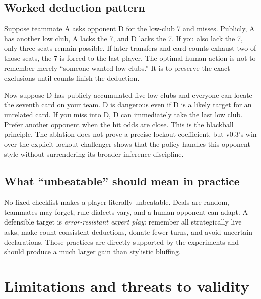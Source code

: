 \documentclass[11pt]{article}
\begin{document}
\subsection{Worked deduction pattern}

Suppose teammate A asks opponent D for the low-club 7 and misses. Publicly, A has another low club, A lacks the 7, and D lacks the 7. If you also lack the 7, only three seats remain possible. If later transfers and card counts exhaust two of those seats, the 7 is forced to the last player. The optimal human action is not to remember merely ``someone wanted low clubs.'' It is to preserve the exact exclusions until counts finish the deduction.

Now suppose D has publicly accumulated five low clubs and everyone can locate the seventh card on your team. D is dangerous even if D is a likely target for an unrelated card. If you miss into D, D can immediately take the last low club. Prefer another opponent when the hit odds are close. This is the blackball principle. The ablation does not prove a precise lockout coefficient, but v0.3's win over the explicit lockout challenger shows that the policy handles this opponent style without surrendering its broader inference discipline.

\subsection{What ``unbeatable'' should mean in practice}

No fixed checklist makes a player literally unbeatable. Deals are random, teammates may forget, rule dialects vary, and a human opponent can adapt. A defensible target is \emph{error-resistant expert play}: remember all strategically live asks, make count-consistent deductions, donate fewer turns, and avoid uncertain declarations. Those practices are directly supported by the experiments and should produce a much larger gain than stylistic bluffing.

\section{Limitations and threats to validity}
\end{document}
